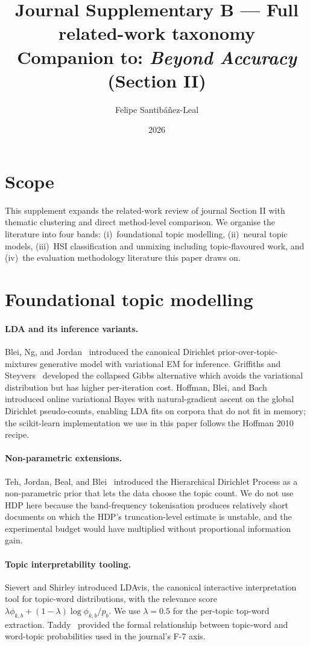 \documentclass[11pt,a4paper]{article}
\title{Journal Supplementary B --- Full related-work taxonomy\\
{\large Companion to: \emph{Beyond Accuracy} (Section II)}}
\author{Felipe Santib\'a\~nez-Leal}
\date{2026}
\begin{document}
\maketitle

\section{Scope}
This supplement expands the related-work review of journal Section II
with thematic clustering and direct method-level comparison. We
organise the literature into four bands: (i)~foundational topic
modelling, (ii)~neural topic models, (iii)~HSI classification and
unmixing including topic-flavoured work, and (iv)~the evaluation
methodology literature this paper draws on.

\section{Foundational topic modelling}

\paragraph{LDA and its inference variants.} Blei, Ng, and
Jordan~\cite{blei2003lda} introduced the canonical Dirichlet
prior-over-topic-mixtures generative model with variational EM for
inference. Griffiths and Steyvers~\cite{griffiths2004finding}
developed the collapsed Gibbs alternative which avoids the
variational distribution but has higher per-iteration cost.
Hoffman, Blei, and Bach~\cite{hoffman2010online} introduced
online variational Bayes with natural-gradient ascent on the global
Dirichlet pseudo-counts, enabling LDA fits on corpora that do not
fit in memory; the scikit-learn implementation
\cite{pedregosa2011scikit} we use in this paper follows the
Hoffman 2010 recipe.

\paragraph{Non-parametric extensions.} Teh, Jordan, Beal, and
Blei~\cite{teh2006hdp} introduced the Hierarchical Dirichlet
Process as a non-parametric prior that lets the data choose the
topic count. We do not use HDP here because the band-frequency
tokenisation produces relatively short documents on which the HDP's
truncation-level estimate is unstable, and the experimental
budget would have multiplied without proportional information gain.

\paragraph{Topic interpretability tooling.} Sievert and Shirley
\cite{sievert2014ldavis} introduced LDAvis, the canonical
interactive interpretation tool for topic-word distributions, with
the relevance score $\lambda \phi_{k,b} + (1-\lambda) \log
\phi_{k,b}/p_b$. We use $\lambda = 0.5$ for the per-topic top-word
extraction. Taddy~\cite{taddy2012estimation} provided the formal
relationship between topic-word and word-topic probabilities used
in the journal's F-7 axis.
\end{document}
